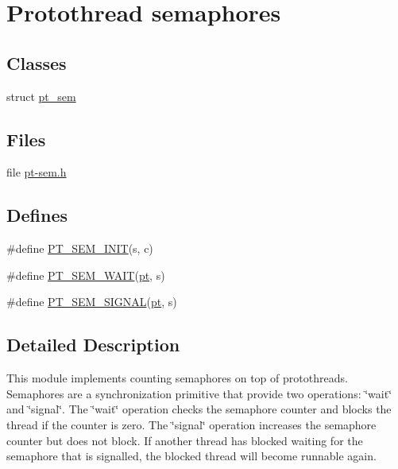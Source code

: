 \hypertarget{group__ptsem}{
\section{Protothread semaphores}
\label{group__ptsem}
}
\subsection*{Classes}
\begin{DoxyCompactItemize}
\item 
struct \hyperlink{structpt__sem}{pt\_\-sem}
\end{DoxyCompactItemize}
\subsection*{Files}
\begin{DoxyCompactItemize}
\item 
file \hyperlink{pt-sem_8h}{pt-\/sem.h}
\end{DoxyCompactItemize}
\subsection*{Defines}
\begin{DoxyCompactItemize}
\item 
\#define \hyperlink{group__ptsem_gad7089c5dc86f12019f0361d82a75b04b}{PT\_\-SEM\_\-INIT}(s, c)
\item 
\#define \hyperlink{group__ptsem_ga386ff87a52a840512906f2940e229e2e}{PT\_\-SEM\_\-WAIT}(\hyperlink{structpt}{pt}, s)
\item 
\#define \hyperlink{group__ptsem_ga1eaaf4d9d75e24582acc6440d7085f19}{PT\_\-SEM\_\-SIGNAL}(\hyperlink{structpt}{pt}, s)
\end{DoxyCompactItemize}


\subsection{Detailed Description}
This module implements counting semaphores on top of protothreads. Semaphores are a synchronization primitive that provide two operations: \char`\"{}wait\char`\"{} and \char`\"{}signal\char`\"{}. The \char`\"{}wait\char`\"{} operation checks the semaphore counter and blocks the thread if the counter is zero. The \char`\"{}signal\char`\"{} operation increases the semaphore counter but does not block. If another thread has blocked waiting for the semaphore that is signalled, the blocked thread will become runnable again.

